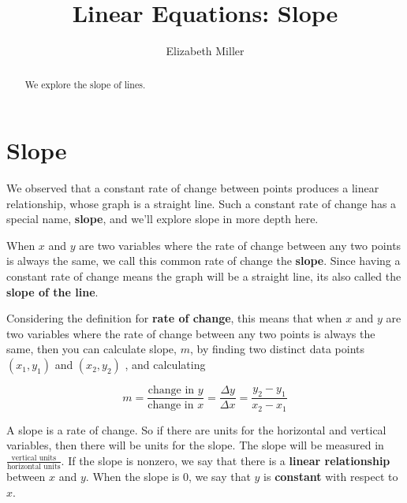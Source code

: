 \documentclass{ximera}
\author{Elizabeth Miller}
\title{Linear Equations: Slope}
\begin{document}
\begin{abstract}
  We explore the slope of lines.
\end{abstract}
\maketitle







\section{Slope}
We observed that a constant rate of change between points produces a linear relationship, whose graph is a straight line. Such a constant rate of change has a special name, \textbf{slope}, and we'll explore slope in more depth here.

\begin{tcolorbox}
\begin{definition}
 When $x$ and $y$ are two variables where the rate of change between any two points is always the same, we call this common rate of change the \textbf{slope}. Since having a constant rate of change means the graph will be a straight line, its also called the \textbf{slope of the line}.
\end{definition}
\end{tcolorbox}

Considering the definition for \textbf{rate of change}, this means that when $x$  and $y$  are two variables where the rate of change between any two points is always the same, then you can calculate slope, $m$, by finding two distinct data points $(x_1,y_1)$ and $(x_2,y_2)$ ,  and calculating 

$$ m=\frac{\text{change in } y}{\text{change in } x} = \frac{\Delta y}{\Delta x} = \frac{y_2-y_1}{x_2-x_1}$$

A slope is a rate of change. So if there are units for the horizontal and vertical variables, then there will be units for the slope. The slope will be measured in $\frac{\text{vertical units}}{\text{horizontal units}}$.  If the slope is nonzero, we say that there is a \textbf{linear relationship} between $x$ and $y$.  When the slope is 0,  we say that $y$  is \textbf{constant} with respect to $x$. 
\end{document}
